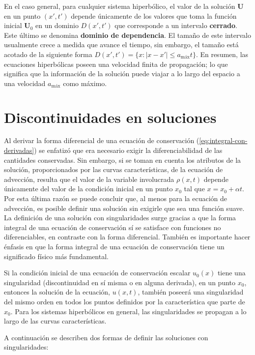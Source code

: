 En el caso general, para cualquier sistema hiperbólico, el valor de la solución $\mathbf{U}$ en un punto $(x',t')$ depende únicamente de los valores que toma la función inicial $\mathbf{U}_0$ en un dominio $D(x',t')$ que corresponde a un intervalo \textbf{cerrado}. Este último se denomina \textbf{dominio de dependencia}. El tamaño de este intervalo usualmente crece a medida que avance el tiempo, sin embargo, el tamaño está acotado de la siguiente forma $D(x',t') = \{x : |x-x'| \leq a_{\text{máx}}t \}$. En resumen, las ecuaciones hiperbólicas poseen una velocidad finita de propagación; lo que significa que la información de la solución puede viajar a lo largo del espacio a una velocidad $a_{\text{máx}}$ como máximo.

\section{Discontinuidades en soluciones}
Al derivar la forma diferencial de una ecuación de conservación (\ref{eq:integral-con-derivadas}) se enfatizó que era necesario exigir la diferenciabilidad de las cantidades conservadas. Sin embargo, si se toman en cuenta los atributos de la solución, proporcionados por las curvas características, de la ecuación de advección, resulta que el valor de la variable involucrada $\rho(x,t)$ depende únicamente del valor de la condición inicial en un punto $x_0$ tal que $x = x_0 + \alpha t$. Por esta última razón se puede concluir que, al menos para la ecuación de advección, es posible definir una solución sin exigirle que sea una función  suave. La definición de una solución con singularidades surge gracias a que la forma integral de una ecuación de conservación sí se satisface con funciones no diferenciables, en contraste con la forma diferencial. También es importante hacer énfasis en que la forma integral de una ecuación de conservación tiene un significado físico más fundamental.

Si la condición inicial de una ecuación de conservación escalar $u_0(x)$ tiene una singularidad (discontinuidad en sí misma o en alguna derivada), en un punto $x_0$, entonces la solución de la ecuación, $u(x,t)$, también poseerá una singularidad del mismo orden en todos los puntos definidos por la característica que parte de $x_0$. Para los sistemas hiperbólicos en general, las singularidades se propagan a lo largo de las curvas características.

A continuación se describen dos formas de definir las soluciones con singularidades:
